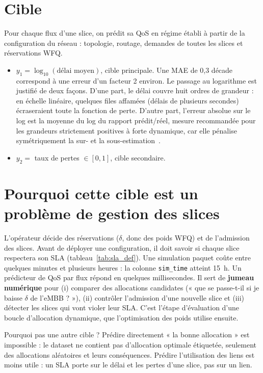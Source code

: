\documentclass[11pt,a4paper]{report}
\begin{document}
\section{Cible}
Pour chaque flux d'une slice, on prédit sa QoS en régime établi à partir de la configuration du réseau : topologie, routage, demandes de toutes les slices et réservations WFQ.
\begin{itemize}[nosep]
  \item $y_1=\log_{10}(\text{délai moyen})$, cible principale. Une MAE de 0,3 décade correspond à une erreur d'un facteur 2 environ. Le passage au logarithme est justifié de deux façons. D'une part, le délai couvre huit ordres de grandeur : en échelle linéaire, quelques files affamées (délais de plusieurs secondes) écraseraient toute la fonction de perte. D'autre part, l'erreur absolue sur le log est la moyenne du log du rapport prédit/réel, mesure recommandée pour les grandeurs strictement positives à forte dynamique, car elle pénalise symétriquement la sur- et la sous-estimation~\cite{tofallis}.
  \item $y_2=$ taux de pertes $\in[0,1]$, cible secondaire.
\end{itemize}

\section{Pourquoi cette cible est un problème de gestion des slices}
L'opérateur décide des réservations ($\delta$, donc des poids WFQ) et de l'admission des slices. Avant de déployer une configuration, il doit savoir si chaque slice respectera son SLA (tableau~\ref{tab:sla_def}). Une simulation paquet coûte entre quelques minutes et plusieurs heures : la colonne \texttt{sim\_time} atteint 15~h. Un prédicteur de QoS par flux répond en quelques millisecondes. Il sert de \textbf{jumeau numérique} pour (i) comparer des allocations candidates (« que se passe-t-il si je baisse $\delta$ de l'eMBB ? »), (ii) contrôler l'admission d'une nouvelle slice et (iii) détecter les slices qui vont violer leur SLA. C'est l'étape d'évaluation d'une boucle d'allocation dynamique, que l'optimisation des poids utilise ensuite.

Pourquoi pas une autre cible ? Prédire directement « la bonne allocation » est impossible : le dataset ne contient pas d'allocation optimale étiquetée, seulement des allocations aléatoires et leurs conséquences. Prédire l'utilisation des liens est moins utile : un SLA porte sur le délai et les pertes d'une slice, pas sur un lien.
\end{document}

